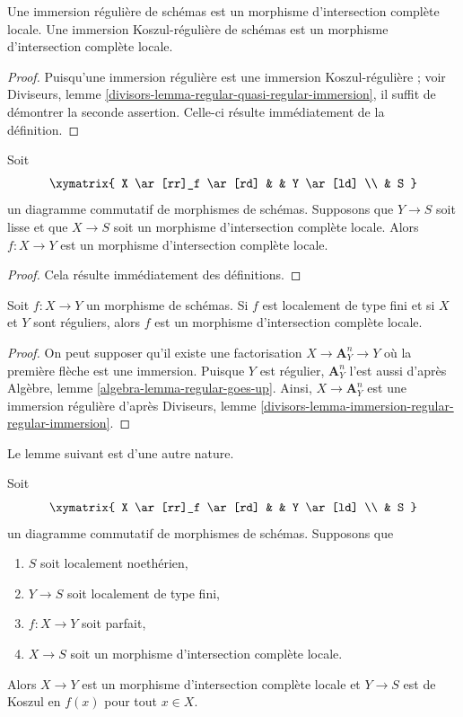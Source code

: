 \begin{lemma}
\label{lemma-regular-immersion-lci}
Une immersion régulière de schémas est un morphisme d'intersection complète locale.
Une immersion Koszul-régulière de schémas est un morphisme d'intersection complète
locale.
\end{lemma}

\begin{proof}
Puisqu'une immersion régulière est une immersion Koszul-régulière ; voir
Diviseurs, lemme \ref{divisors-lemma-regular-quasi-regular-immersion},
il suffit de démontrer la seconde assertion. Celle-ci
résulte immédiatement de la définition.
\end{proof}

\begin{lemma}
\label{lemma-lci-permanence}
Soit
$$
\xymatrix{
X \ar[rr]_f \ar[rd] & & Y \ar[ld] \\
& S
}
$$
un diagramme commutatif de morphismes de schémas. Supposons que $Y \to S$
soit lisse et que $X \to S$ soit un morphisme d'intersection complète locale.
Alors $f : X \to Y$ est un morphisme d'intersection complète locale.
\end{lemma}

\begin{proof}
Cela résulte immédiatement des définitions.
\end{proof}

\begin{lemma}
\label{lemma-morphism-regular-schemes-is-lci}
Soit $f : X \to Y$ un morphisme de schémas. Si $f$ est localement
de type fini et si $X$ et $Y$ sont réguliers, alors
$f$ est un morphisme d'intersection complète locale.
\end{lemma}

\begin{proof}
On peut supposer qu'il existe une factorisation $X \to \mathbf{A}^n_Y \to Y$
où la première flèche est une immersion.
Puisque $Y$ est régulier, $\mathbf{A}^n_Y$ l'est aussi d'après
Algèbre, lemme \ref{algebra-lemma-regular-goes-up}.
Ainsi, $X \to \mathbf{A}^n_Y$ est une immersion régulière d'après
Diviseurs, lemme \ref{divisors-lemma-immersion-regular-regular-immersion}.
\end{proof}

\noindent
Le lemme suivant est d'une autre nature.

\begin{lemma}
\label{lemma-lci-avramov}
Soit
$$
\xymatrix{
X \ar[rr]_f \ar[rd] & & Y \ar[ld] \\
& S
}
$$
un diagramme commutatif de morphismes de schémas. Supposons que
\begin{enumerate}
\item $S$ soit localement noethérien,
\item $Y \to S$ soit localement de type fini,
\item $f : X \to Y$ soit parfait,
\item $X \to S$ soit un morphisme d'intersection complète locale.
\end{enumerate}
Alors $X \to Y$ est un morphisme d'intersection complète locale
et $Y \to S$ est de Koszul en $f(x)$ pour tout $x \in X$.
\end{lemma}

